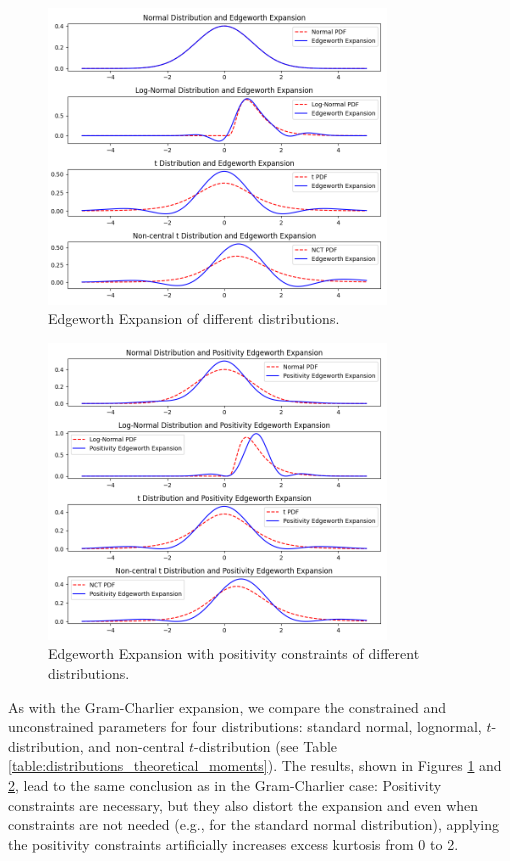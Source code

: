 \begin{figure}[h]
    \centering
    \includegraphics[width=0.8\textwidth]{img/ew_expansion.png}
    \caption{Edgeworth Expansion of different distributions.}
    \label{fig:ew_expansion}
\end{figure}

\begin{figure}[h]
    \centering
    \includegraphics[width=0.8\textwidth]{img/ew_positivity_expansion.png}
    \caption{Edgeworth Expansion with positivity constraints of different distributions.}
    \label{fig:ew_positivity_expansion}
\end{figure}

As with the Gram-Charlier expansion, we compare the constrained and unconstrained parameters for four distributions: standard normal, lognormal, $t$-distribution, and non-central $t$-distribution (see Table \ref{table:distributions_theoretical_moments}). The results, shown in Figures \ref{fig:ew_expansion} and \ref{fig:ew_positivity_expansion}, lead to the same conclusion as in the Gram-Charlier case: Positivity constraints are necessary, but they also distort the expansion and even when constraints are not needed (e.g., for the standard normal distribution), applying the positivity constraints artificially increases excess kurtosis from 0 to 2.